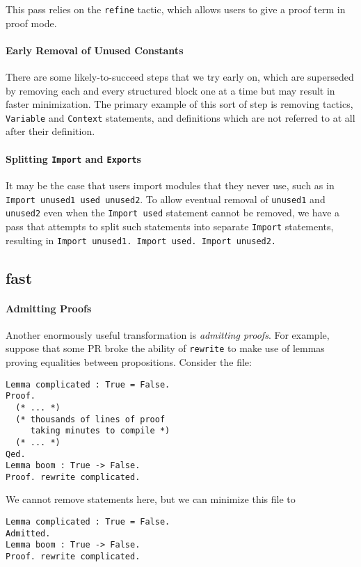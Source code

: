 \documentclass[a4paper,USenglish,cleveref,autoref,thm-restate]{lipics-v2021}
\begin{document}
This pass relies on the \verb|refine| tactic, which allows users to give a proof term in proof mode.


\paragraph{Early Removal of Unused Constants}
There are some likely-to-succeed steps that we try early on, which are superseded by removing each and every structured block one at a time but may result in faster minimization.
The primary example of this sort of step is removing tactics, \verb|Variable| and \verb|Context| statements, and definitions which are not referred to at all after their definition.

\paragraph{Splitting \texttt{Import} and \texttt{Export}s}
It may be the case that users import modules that they never use, such as in \texttt{Import unused1 used unused2}.
To allow eventual removal of \verb|unused1| and \verb|unused2| even when the \verb|Import used| statement cannot be removed, we have a pass that attempts to split such statements into separate \verb|Import| statements, resulting in \texttt{Import unused1. Import used. Import unused2.}

\subsection{fast}
\paragraph{Admitting Proofs}
Another enormously useful transformation is \emph{admitting proofs}.
For example, suppose that some PR broke the ability of \verb|rewrite| to make use of lemmas proving equalities between propositions.
Consider the file:
\begin{verbatim}
Lemma complicated : True = False.
Proof.
  (* ... *)
  (* thousands of lines of proof
     taking minutes to compile *)
  (* ... *)
Qed.
Lemma boom : True -> False.
Proof. rewrite complicated.
\end{verbatim}
We cannot remove statements here, but we can minimize this file to
\begin{verbatim}
Lemma complicated : True = False.
Admitted.
Lemma boom : True -> False.
Proof. rewrite complicated.
\end{verbatim}
\end{document}
